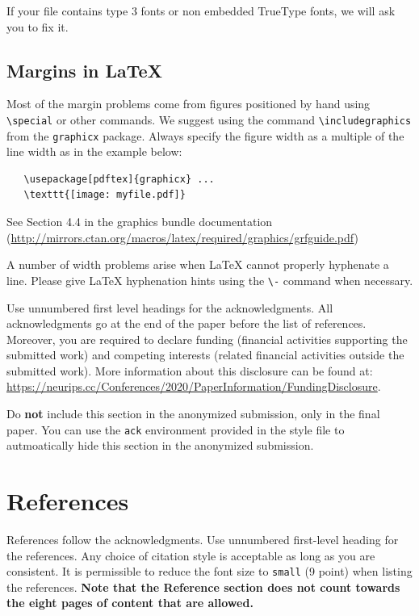\documentclass{article}
\begin{document}
If your file contains type 3 fonts or non embedded TrueType fonts, we will ask
you to fix it.

\subsection{Margins in \LaTeX{}}

Most of the margin problems come from figures positioned by hand using
\verb+\special+ or other commands. We suggest using the command
\verb+\includegraphics+ from the \verb+graphicx+ package. Always specify the
figure width as a multiple of the line width as in the example below:
\begin{verbatim}
   \usepackage[pdftex]{graphicx} ...
   \texttt{[image: myfile.pdf]}
\end{verbatim}
See Section 4.4 in the graphics bundle documentation
(\url{http://mirrors.ctan.org/macros/latex/required/graphics/grfguide.pdf})

A number of width problems arise when \LaTeX{} cannot properly hyphenate a
line. Please give LaTeX hyphenation hints using the \verb+\-+ command when
necessary.



\begin{ack}
Use unnumbered first level headings for the acknowledgments. All acknowledgments
go at the end of the paper before the list of references. Moreover, you are required to declare 
funding (financial activities supporting the submitted work) and competing interests (related financial activities outside the submitted work). 
More information about this disclosure can be found at: \url{https://neurips.cc/Conferences/2020/PaperInformation/FundingDisclosure}.


Do {\bf not} include this section in the anonymized submission, only in the final paper. You can use the \texttt{ack} environment provided in the style file to autmoatically hide this section in the anonymized submission.
\end{ack}

\section*{References}

References follow the acknowledgments. Use unnumbered first-level heading for
the references. Any choice of citation style is acceptable as long as you are
consistent. It is permissible to reduce the font size to \verb+small+ (9 point)
when listing the references.
{\bf Note that the Reference section does not count towards the eight pages of content that are allowed.}
\medskip
\end{document}
